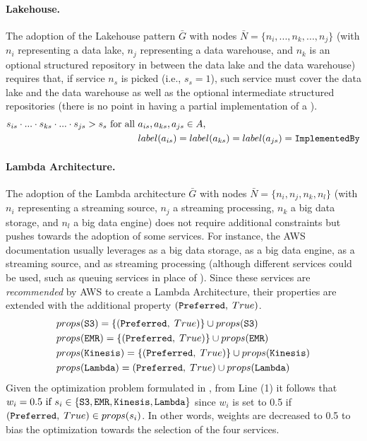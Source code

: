 \paragraph{Lakehouse.}

The adoption of the Lakehouse pattern $\bar{G}$ with nodes $\bar{N}=\{n_i,...,n_k,...,n_j\}$ (with $n_i$ representing a data lake, $n_j$ representing a data warehouse, and $n_k$ is an optional structured repository in between the data lake and the data warehouse) requires that, if  service $n_s$ is picked (i.e., $s_s=1$), such service must cover the data lake and the data warehouse as well as the optional intermediate structured repositories (there is no point in having a partial implementation of a ).
{\footnotesize
\begin{align*}
s_{is}\cdot ... \cdot s_{ks} \cdot ... \cdot s_{js} > s_s   \textup{ for all }& a_{is}, a_{ks}, a_{js} \in A,\\
& label(a_{is})=label(a_{ks})=label(a_{js})=\texttt{ImplementedBy}
\end{align*}
}

\paragraph{Lambda Architecture.}

The adoption of the Lambda architecture $\bar{G}$ with nodes $\bar{N}=\{n_i,n_j,n_k,n_l\}$ (with $n_i$ representing a streaming source, $n_j$ a streaming processing, $n_k$ a big data storage, and $n_l$ a big data engine) does not require additional constraints but pushes towards the adoption of some services. For instance, the AWS documentation usually leverages  as a big data storage,  as a big data engine,  as a streaming source, and  as streaming processing (although different services could be used, such as queuing services in place of ). Since these services are \textit{recommended} by AWS to create a Lambda Architecture, their properties are extended with the additional property $(\texttt{Preferred},\;True)$.
\begin{align*}
&props(\texttt{\textup{S3}}) = \{(\texttt{Preferred},\;True)\} \cup props(\texttt{\textup{S3}})\\
&props(\texttt{\textup{EMR}}) = \{(\texttt{Preferred},\;True)\} \cup props(\texttt{\textup{EMR}})\\
&props(\texttt{\textup{Kinesis}}) = \{(\texttt{Preferred},\;True)\} \cup props(\texttt{\textup{Kinesis}})\\
&props(\texttt{\textup{Lambda}}) = (\texttt{Preferred},\;True) \cup props(\texttt{\textup{Lambda}})
\end{align*}
Given the optimization problem formulated in , from Line (1) it follows that $w_i = 0.5 \textup{ if } s_i \in \{\texttt{\textup{S3}}, \texttt{\textup{EMR}}, \texttt{\textup{Kinesis}}, \texttt{\textup{Lambda}}\}$ since $w_i$ is set to 0.5 if $(\texttt{Preferred},\;True) \in props(s_i)$. In other words, weights are decreased to 0.5 to bias the optimization towards the selection of the four services.

